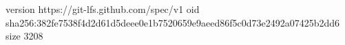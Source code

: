 version https://git-lfs.github.com/spec/v1
oid sha256:382fe7538f4d2d61d5deee0e1b7520659e9aeed86f5c0d73e2492a07425b2dd6
size 3208
